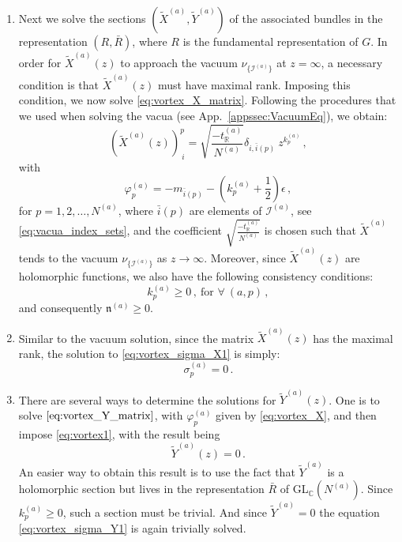 \documentclass[12pt,a4paper]{article}
\newcommand{\nn}{\mathfrak{n}}
\renewcommand{\(}{\left(}
\renewcommand{\)}{\right)}
\renewcommand{\(}{\left(}
\renewcommand{\)}{\right)}
\begin{document}
\begin{enumerate}
\item Next we solve the sections $(\tilde{X}^{(a)},\tilde{Y}^{(a)})$ of the associated bundles in the representation $(R,\bar{R})$, where $R$ is the fundamental representation of $G$. 
In order for $\tilde{X}^{(a)}(z)$ to approach the vacuum $\nu_{\{\mathcal{I}^{(a)}\}}$ at $z=\infty$, a necessary condition is that $\tilde{X}^{(a)}(z)$ must have maximal rank. 
Imposing this condition, we now solve \eqref{eq:vortex_X_matrix}. 
Following the procedures that we used when solving the vacua (see App.~\ref{appssec:VacuumEq}), we obtain:
\begin{equation}\label{eq:vortex_X}
\left(\tilde{X}^{(a)}(z)\right)^p_{\ i}=\sqrt{\frac{-t_{\mathbb{R}}^{(a)}}{N^{(a)}}} \delta_{i,\bar{i}(p)}\ z^{k^{(a)}_p}\,, 
\end{equation}
with
\begin{equation}\label{eq:vortex_X_varphi}
\varphi^{(a)}_p=-m_{\bar{i}(p)}-(k^{(a)}_p+\frac{1}{2})\epsilon\,,
\end{equation}
for $p=1,2,\dots,N^{(a)}$, where $\bar{i}(p)$ are elements of $\mathcal{I}^{(a)}$, see \eqref{eq:vacua_index_sets}, and the coefficient $\sqrt{\frac{-t_{\mathbb{R}}^{(a)}}{N^{(a)}}} $ is chosen such that $\tilde{X}^{(a)}$ tends to the vacuum $\nu_{\{\mathcal{I}^{(a)}\}}$ as $z\to\infty $. 
Moreover, since $\tilde{X}^{(a)}(z)$ are holomorphic functions, we also have the following consistency conditions:
\begin{equation}
    k^{(a)}_p\geq 0\,,\ \text{for\ }\forall \ (a,p)\,,
\end{equation}
and consequently $\nn^{(a)}\geq 0$.

\item Similar to the vacuum solution, since the matrix $\tilde{X}^{(a)}(z)$ has the maximal rank, the solution to \eqref{eq:vortex_sigma_X1} is simply:
\begin{equation}\label{eq:vortex_sigma}
\sigma^{(a)}_p=0\,.
\end{equation}


\item There are several ways to determine the solutions for $\tilde{Y}^{(a)}(z)$. 
One is to solve $\eqref{eq:vortex_Y_matrix}$, with $\varphi^{(a)}_p$ given by \eqref{eq:vortex_X}, and then impose \eqref{eq:vortex1}, with the  result being \begin{equation}\label{eq:Yz=0}
\tilde{Y}^{(a)}(z)=0 \,.   
\end{equation}
An easier way to obtain this result is to use the fact that $\tilde{Y}^{(a)}$ is a holomorphic section but lives in the representation $\bar{R}$ of GL$_{\mathbb{C}}(N^{(a)})$. Since $k^{(a)}_p\geq 0$, such a section must be trivial. 
And since $\tilde{Y}^{(a)}=0$ the equation \eqref{eq:vortex_sigma_Y1} is again trivially solved. 

\end{enumerate}
\end{document}
